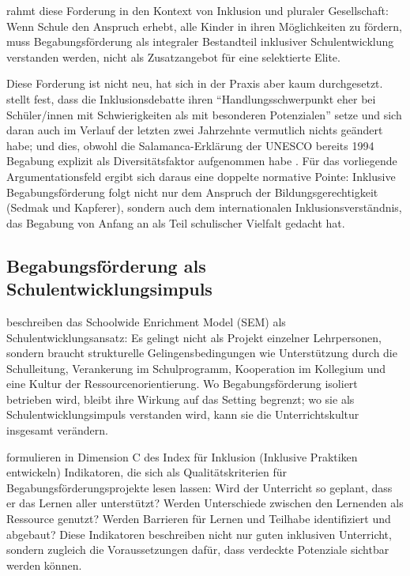 \documentclass[ngerman, a4paper]{article}
\begin{document}
\textcite{muelleroppliger2021plurale} rahmt diese Forderung in den Kontext von Inklusion und pluraler
Gesellschaft: Wenn Schule den Anspruch erhebt, alle Kinder in ihren Möglichkeiten
zu fördern, muss Begabungsförderung als integraler Bestandteil inklusiver
Schulentwicklung verstanden werden, nicht als Zusatzangebot für eine selektierte
Elite.

Diese Forderung ist nicht neu, hat sich in der Praxis aber kaum durchgesetzt.
\textcite[S.\,119]{baudson2021wasdenken} stellt fest, dass die Inklusionsdebatte
ihren \enquote{Handlungsschwerpunkt eher bei Schüler/innen mit Schwierigkeiten als
mit besonderen Potenzialen} setze und sich daran auch im Verlauf der letzten zwei
Jahrzehnte vermutlich nichts geändert habe; und dies, obwohl die
Salamanca-Erklärung der UNESCO bereits 1994 Begabung explizit als
Diversitätsfaktor aufgenommen habe \parencite[S.\,119]{baudson2021wasdenken}. Für
das vorliegende Argumentationsfeld ergibt sich daraus eine doppelte normative
Pointe: Inklusive Begabungsförderung folgt nicht nur dem Anspruch der
Bildungsgerechtigkeit (Sedmak und Kapferer), sondern auch dem internationalen
Inklusionsverständnis, das Begabung von Anfang an als Teil schulischer Vielfalt
gedacht hat.

\subsection{Begabungsförderung als Schulentwicklungsimpuls}

\textcite[S.\,444--454]{renzullireis2021rls} beschreiben das
Schoolwide Enrichment Model (SEM) als Schulentwicklungsansatz: Es gelingt
nicht als Projekt einzelner Lehrpersonen, sondern braucht strukturelle
Gelingensbedingungen wie Unterstützung durch die Schulleitung, Verankerung
im Schulprogramm, Kooperation im Kollegium und eine Kultur der
Ressourcenorientierung. Wo Begabungsförderung isoliert betrieben wird,
bleibt ihre Wirkung auf das Setting begrenzt; wo sie als
Schulentwicklungsimpuls verstanden wird, kann sie die Unterrichtskultur
insgesamt verändern.

\textcite[Dim.\,C]{booth2019index} formulieren in Dimension C des Index für Inklusion (Inklusive
Praktiken entwickeln) Indikatoren, die sich als Qualitätskriterien für
Begabungsförderungsprojekte lesen lassen: Wird der Unterricht so geplant, dass er
das Lernen aller unterstützt? Werden Unterschiede zwischen den Lernenden als
Ressource genutzt? Werden Barrieren für Lernen und Teilhabe identifiziert und
abgebaut? Diese Indikatoren beschreiben nicht nur guten inklusiven Unterricht,
sondern zugleich die Voraussetzungen dafür, dass verdeckte Potenziale sichtbar
werden können.
\end{document}
